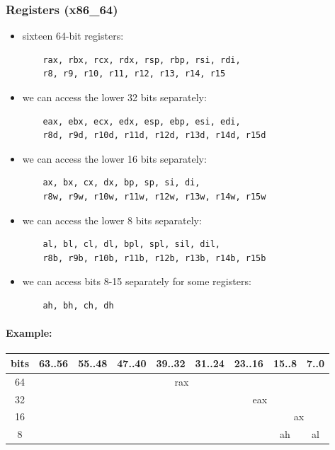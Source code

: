 \documentclass[12pt]{article}
\begin{document}
\subsubsection{Registers (x86\_64)}

\begin{itemize}
    \item sixteen 64-bit registers:
    \begin{verbatim}
    rax, rbx, rcx, rdx, rsp, rbp, rsi, rdi,
    r8, r9, r10, r11, r12, r13, r14, r15
    \end{verbatim}
    
    \item we can access the lower 32 bits separately:
    \begin{verbatim}
    eax, ebx, ecx, edx, esp, ebp, esi, edi,
    r8d, r9d, r10d, r11d, r12d, r13d, r14d, r15d
    \end{verbatim}
    
    \item we can access the lower 16 bits separately:
    \begin{verbatim}
    ax, bx, cx, dx, bp, sp, si, di,
    r8w, r9w, r10w, r11w, r12w, r13w, r14w, r15w
    \end{verbatim}
    
    \item we can access the lower 8 bits separately:
    \begin{verbatim}
    al, bl, cl, dl, bpl, spl, sil, dil,
    r8b, r9b, r10b, r11b, r12b, r13b, r14b, r15b
    \end{verbatim}
    
    \item we can access bits 8-15 separately for some registers:
    \begin{verbatim}
    ah, bh, ch, dh
    \end{verbatim}
\end{itemize}

\paragraph{Example:}
\begin{tabular}{|c|c|c|c|c|c|c|c|c|}
\hline
\textbf{bits} & \textbf{63..56} & \textbf{55..48} & \textbf{47..40} & \textbf{39..32} & \textbf{31..24} & \textbf{23..16} & \textbf{15..8} & \textbf{7..0} \\
\hline
64 & \multicolumn{8}{c|}{rax} \\
\hline
32 & \multicolumn{4}{c|}{} & \multicolumn{4}{c|}{eax} \\
\hline
16 &  &  &  &  &  & & \multicolumn{2}{c|}{ax} \\
\hline
8 &  &  &  &  &  &  & ah & al \\
\hline
\end{tabular}
\end{document}
